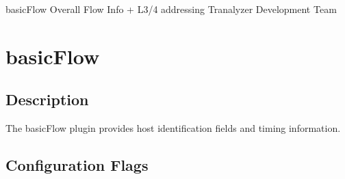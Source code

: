 \documentclass[documentation]{subfiles}
\begin{document}
\trantitle
    {basicFlow}
    {Overall Flow Info + L3/4 addressing}
    {Tranalyzer Development Team} %

\section{basicFlow}\label{s:basicFlow}

\subsection{Description}
The basicFlow plugin provides host identification fields and timing information.




\subsection{Configuration Flags}
\end{document}
